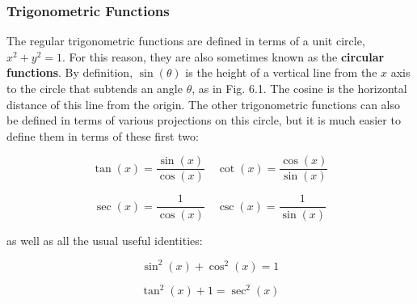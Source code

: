 \documentclass[11pt,titlepage]{article}
\numberwithin{equation}{section}
\begin{document}
\subsubsection{Trigonometric Functions}
\begin{tcolorbox}
\centering
{}
\end{tcolorbox}

The regular trigonometric functions are defined in terms of a unit circle, $x^{2}+y^{2}=1$. For this reason, they are also sometimes known as the \textbf{circular functions}. By definition, $\sin(\theta)$ is the height of a vertical line from the $x$ axis to the circle that subtends an angle $\theta$, as in Fig. 6.1. The cosine is the horizontal distance of this line from the origin. The other trigonometric functions can also be defined in terms of various projections on this circle, but it is much easier to define them in terms of these first two:

\begin{equation}
\tan(x)=\frac{\sin(x)}{\cos(x)} \quad \cot(x)=\frac{\cos(x)}{\sin(x)}
\end{equation}

\begin{equation}
\sec(x)=\frac{1}{\cos(x)} \quad \csc(x)=\frac{1}{\sin(x)}
\end{equation}

as well as all the usual useful identities:

\begin{equation}
\sin^{2}(x)+\cos^{2}(x)=1
\end{equation}

\begin{equation}
\tan^{2}(x)+1=\sec^{2}(x)
\end{equation}
\end{document}

